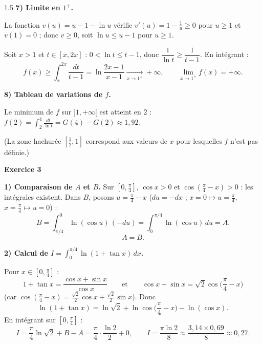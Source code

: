 \documentclass[12pt]{article}
\begin{document}
\begin{spacing}{1.5}
\textbf{7) Limite en $1^+$.}

La fonction $v(u)=u-1-\ln u$ vérifie $v'(u)=1-\frac1u\ge0$ pour $u\ge1$ et $v(1)=0$ ; donc $v\ge0$, soit $\ln u\le u-1$ pour $u\ge1$.

Soit $x>1$ et $t\in[x,2x]$ : $0<\ln t\le t-1$, donc $\dfrac1{\ln t}\ge\dfrac1{t-1}$. En intégrant :
\[
f(x)\ge\int_x^{2x}\frac{dt}{t-1}=\ln\frac{2x-1}{x-1}\xrightarrow[x\to1^+]{}+\infty,\qquad\boxed{\lim_{x\to1^+}f(x)=+\infty}.
\]

\textbf{8) Tableau de variations de $f$.}

Le minimum de $f$ sur $]1,+\infty[$ est atteint en $2$ : $f(2)=\displaystyle\int_2^4\frac{dt}{\ln t}=G(4)-G(2)\approx1{,}92$.
\begin{center}
\end{center}
(La zone hachurée $[\frac12,1]$ correspond aux valeurs de $x$ pour lesquelles $f$ n'est pas définie.)

\medskip\textbf{Exercice 3}

\textbf{1) Comparaison de $A$ et $B$.} Sur $[0,\frac\pi4]$, $\cos x>0$ et $\cos(\frac\pi4-x)>0$ : les intégrales existent. Dans $B$, posons $u=\frac\pi4-x$ ($du=-dx$ ; $x=0\mapsto u=\frac\pi4$, $x=\frac\pi4\mapsto u=0$) :
\[
B=\int_{\pi/4}^0\ln(\cos u)\,(-du)=\int_0^{\pi/4}\ln(\cos u)\,du=A .
\]
\[
\boxed{A=B}.
\]

\textbf{2) Calcul de $I=\displaystyle\int_0^{\pi/4}\ln(1+\tan x)\,dx$.}

Pour $x\in[0,\frac\pi4]$ :
\[
1+\tan x=\frac{\cos x+\sin x}{\cos x}\qquad\text{et}\qquad\cos x+\sin x=\sqrt2\cos\Big(\frac\pi4-x\Big)
\]
(car $\cos(\frac\pi4-x)=\frac{\sqrt2}2\cos x+\frac{\sqrt2}2\sin x$). Donc
\[
\ln(1+\tan x)=\ln\sqrt2+\ln\cos\Big(\frac\pi4-x\Big)-\ln(\cos x).
\]
En intégrant sur $[0,\frac\pi4]$ :
\[
I=\frac\pi4\ln\sqrt2+B-A=\frac\pi4\cdot\frac{\ln2}{2}+0,\qquad\boxed{I=\frac{\pi\ln2}{8}\approx\frac{3{,}14\times0{,}69}{8}\approx0{,}27}.
\]

\end{spacing}
\end{document}
